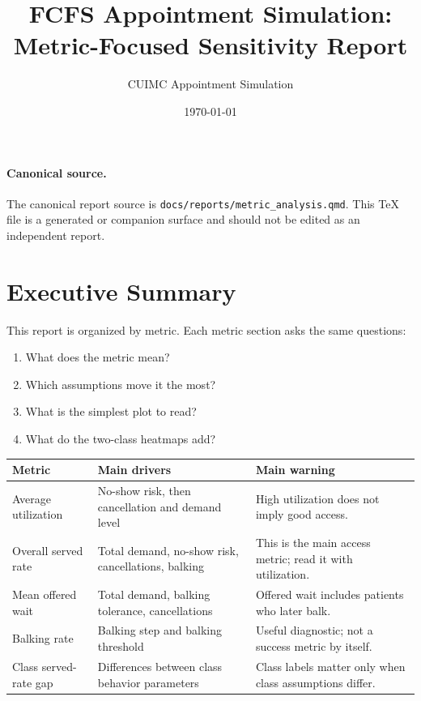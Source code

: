 \documentclass[11pt]{article}
\title{FCFS Appointment Simulation: Metric-Focused Sensitivity Report}
\author{CUIMC Appointment Simulation}
\date{\today}
\begin{document}
\maketitle

\paragraph{Canonical source.} The canonical report source is
\texttt{docs/reports/metric\_analysis.qmd}. This TeX file is a generated or companion
surface and should not be edited as an independent report.

\tableofcontents
\newpage

\section{Executive Summary}

This report is organized by metric. Each metric section asks the same questions:

\begin{enumerate}
    \item What does the metric mean?
    \item Which assumptions move it the most?
    \item What is the simplest plot to read?
    \item What do the two-class heatmaps add?
\end{enumerate}

\begin{table}[H]
\centering
\renewcommand{\arraystretch}{1.15}
\begin{tabular}{p{}p{}p{}}
\toprule
Metric & Main drivers & Main warning \\
\midrule
Average utilization & No-show risk, then cancellation and demand level & High utilization does not imply good access. \\
Overall served rate & Total demand, no-show risk, cancellations, balking & This is the main access metric; read it with utilization. \\
Mean offered wait & Total demand, balking tolerance, cancellations & Offered wait includes patients who later balk. \\
Balking rate & Balking step and balking threshold & Useful diagnostic; not a success metric by itself. \\
Class served-rate gap & Differences between class behavior parameters & Class labels matter only when class assumptions differ. \\
\bottomrule
\end{tabular}
\end{table}
\end{document}
